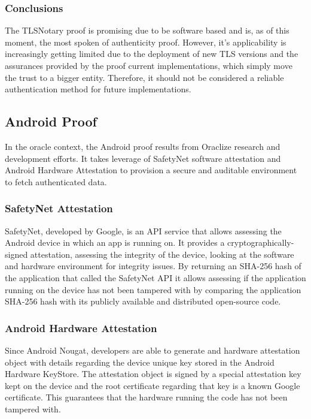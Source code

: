\subsubsection{Conclusions}
The TLSNotary proof is promising due to be software based and is, as of this moment, the most spoken of authenticity proof. However, it's applicability is increasingly getting limited due to the deployment of new TLS versions and the assurances provided by the proof current implementations, which simply move the trust to a bigger entity. Therefore, it should not be considered a reliable authentication method for future implementations.

\subsection{Android Proof}
In the oracle context, the Android proof results from Oraclize research and development efforts. It takes leverage of SafetyNet software attestation and Android Hardware Attestation to provision a secure and auditable environment to fetch authenticated data.

\subsubsection{SafetyNet Attestation}
SafetyNet, developed by Google, is an API service that allows assessing the Android device in which an app is running on. It provides a cryptographically-signed attestation, assessing the integrity of the device, looking at the software and hardware environment for integrity issues. By returning an SHA-256 hash of the application that called the SafetyNet API it allows assessing if the application running on the device has not been tampered with by comparing the application SHA-256 hash with its publicly available and distributed open-source code.

\subsubsection{Android Hardware Attestation}
Since Android Nougat, developers are able to generate and hardware attestation object with details regarding the device unique key stored in the Android Hardware KeyStore. The attestation object is signed by a special attestation key kept on the device and the root certificate regarding that key is a known Google certificate. This guarantees that the hardware running the code has not been tampered with.

